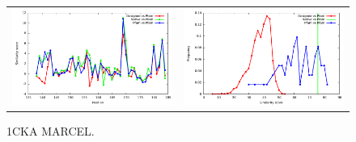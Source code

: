 \documentclass[a4paper,12pt]{article}
\begin{document}
   \begin{figure}[t]
     \centering
     \begin{tabular}{cc}
       \includegraphics[width=8.45cm]{1CKA_MARCEL_simil_bypos.pdf} &
       \includegraphics[width=8.45cm]{1CKA_MARCEL_simil_byseq.pdf} \\
     \end{tabular}
     
     \caption{1CKA MARCEL.}
   \end{figure}


 
\end{document}

